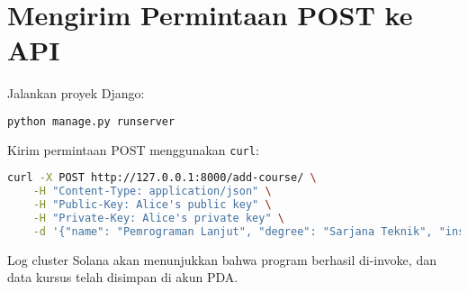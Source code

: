 \section{Mengirim Permintaan POST ke API}
Jalankan proyek Django:

\begin{lstlisting}[language=bash]
	python manage.py runserver
\end{lstlisting}

Kirim permintaan POST menggunakan \texttt{curl}:

\begin{lstlisting}[language=bash]
	curl -X POST http://127.0.0.1:8000/add-course/ \
	-H "Content-Type: application/json" \
	-H "Public-Key: Alice's public key" \
	-H "Private-Key: Alice's private key" \
	-d '{"name": "Pemrograman Lanjut", "degree": "Sarjana Teknik", "institution": "Pradita University", "start_date": "2024-01-10"}'
\end{lstlisting}

Log cluster Solana akan menunjukkan bahwa program berhasil di-invoke, dan data kursus telah disimpan di akun PDA.
